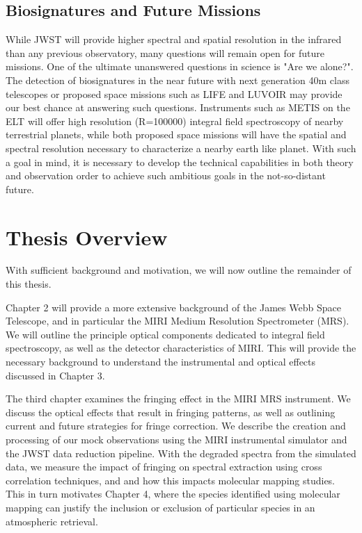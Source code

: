 \subsection{Biosignatures and Future Missions}
While JWST will provide higher spectral and spatial resolution in the infrared than any previous observatory, many questions will remain open for future missions.
One of the ultimate unanswered questions in science is "Are we alone?".
The detection of biosignatures in the near future with next generation 40m class telescopes \parencite{Lopez-Morales2019} or proposed space missions such as LIFE \parencite{Quanz2019} and LUVOIR \parencite{Luvoir2019} may provide our best chance at answering such questions.
Instruments such as METIS on the ELT will offer high resolution (R=100000) integral field spectroscopy of nearby terrestrial planets, while both proposed space missions will have the spatial and spectral resolution necessary to characterize a nearby earth like planet.
With such a goal in mind, it is necessary to develop the technical capabilities in both theory and observation order to achieve such ambitious goals in the not-so-distant future.

\section{Thesis Overview}
With sufficient background and motivation, we will now outline the remainder of this thesis.

Chapter 2 will provide a more extensive background of the James Webb Space Telescope, and in particular the MIRI Medium Resolution Spectrometer (MRS).
We will outline the principle optical components dedicated to integral field spectroscopy, as well as the detector characteristics of MIRI.
This will provide the necessary background to understand the instrumental and optical effects discussed in Chapter 3.

The third chapter examines the fringing effect in the MIRI MRS instrument.
We discuss the optical effects that result in fringing patterns, as well as outlining current and future strategies for fringe correction.
We describe the creation and processing of our mock observations using the MIRI instrumental simulator and the JWST data reduction pipeline.
With the degraded spectra from the simulated data, we measure the impact of fringing on spectral extraction using cross correlation techniques, and and how this impacts molecular mapping studies.
This in turn motivates Chapter 4, where the species identified using molecular mapping can justify the inclusion or exclusion of particular species in an atmospheric retrieval.

